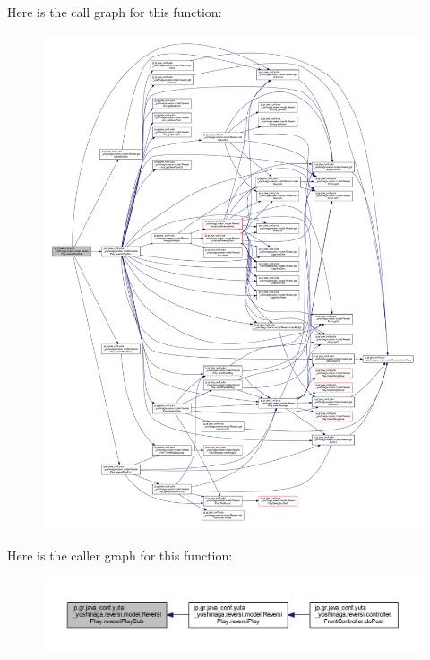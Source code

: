 Here is the call graph for this function\+:
\nopagebreak
\begin{figure}[H]
\begin{center}
\leavevmode
\includegraphics[width=350pt]{classjp_1_1gr_1_1java__conf_1_1yuta__yoshinaga_1_1reversi_1_1model_1_1_reversi_play_a6ea2a343ad2fb3ef1317570e87c3fc4f_cgraph}
\end{center}
\end{figure}
Here is the caller graph for this function\+:
\nopagebreak
\begin{figure}[H]
\begin{center}
\leavevmode
\includegraphics[width=350pt]{classjp_1_1gr_1_1java__conf_1_1yuta__yoshinaga_1_1reversi_1_1model_1_1_reversi_play_a6ea2a343ad2fb3ef1317570e87c3fc4f_icgraph}
\end{center}
\end{figure}
\mbox{\label{classjp_1_1gr_1_1java__conf_1_1yuta__yoshinaga_1_1reversi_1_1model_1_1_reversi_play_a866c2788aa9dd7eb2084da9fc5e5bd5c}} 
